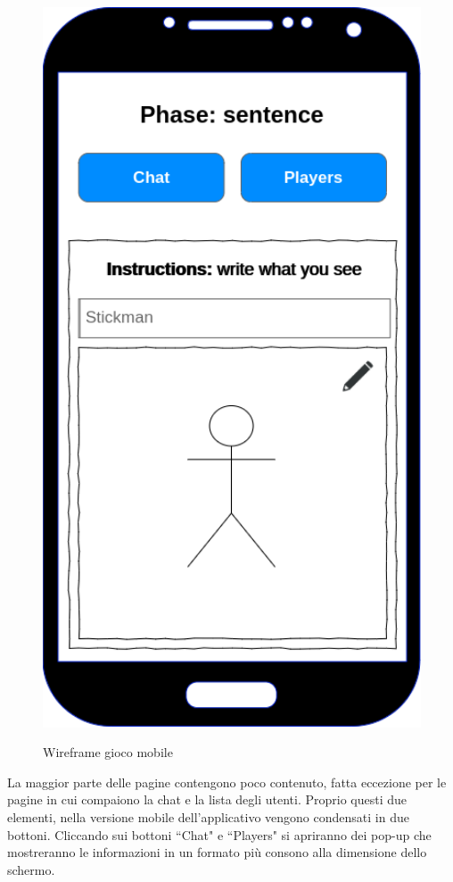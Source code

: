 \begin{figure}[H]
    \caption{Wireframe gioco mobile}
    \centering
    \includegraphics[width=175mm]{img/wireframes/mobile_in_game.png}
    \label{fig:wireframe_in_game_mobile}
\end{figure}

\noindent La maggior parte delle pagine contengono poco contenuto, fatta eccezione per le pagine in cui compaiono la chat e la lista degli utenti.\newline
Proprio questi due elementi, nella versione mobile dell'applicativo vengono condensati in due bottoni. Cliccando sui bottoni ``Chat" e ``Players" si apriranno dei pop-up che mostreranno le informazioni in un formato più consono alla dimensione dello schermo.

